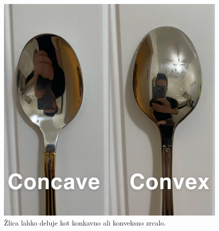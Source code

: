 \begin{figure}[!ht]
\centering
\includegraphics[width=9truecm]{slike/Zlica.jpg}
\caption{Žlica lahko deluje kot konkavno ali konveksno zrcalo.}
\label{fig:02_photos-5}
\end{figure}
